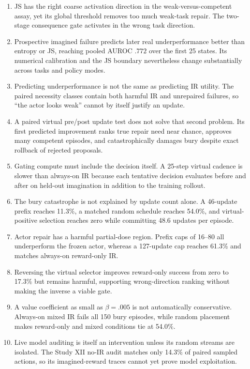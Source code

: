 \documentclass[10pt]{article}
\newcommand{\pct}[1]{#1\%}
\begin{document}
\begin{enumerate}
  \item JS has the right coarse activation direction in the weak-versus-competent assay, yet its global threshold removes too much weak-task repair. The two-stage consequence gate activates in the wrong task direction.
  \item Prospective imagined failure predicts later real underperformance better than entropy or JS, reaching pooled AUROC $.772$ over the first 25 states. Its numerical calibration and the JS boundary nevertheless change substantially across tasks and policy modes.
  \item Predicting underperformance is not the same as predicting IR utility. The paired necessity classes contain both harmful IR and unrepaired failures, so ``the actor looks weak'' cannot by itself justify an update.
  \item A paired virtual pre/post update test does not solve that second problem. Its first predicted improvement ranks true repair need near chance, approves many competent episodes, and catastrophically damages bury despite exact rollback of rejected proposals.
  \item Gating compute must include the decision itself. A 25-step virtual cadence is slower than always-on IR because each tentative decision evaluates before and after on held-out imagination in addition to the training rollout.
  \item The bury catastrophe is not explained by update count alone. A 46-update prefix reaches \pct{11.3}, a matched random schedule reaches \pct{54.0}, and virtual-positive selection reaches zero while committing 48.6 updates per episode.
  \item Actor repair has a harmful partial-dose region. Prefix caps of 16--80 all underperform the frozen actor, whereas a 127-update cap reaches \pct{61.3} and matches always-on reward-only IR.
  \item Reversing the virtual selector improves reward-only success from zero to \pct{17.3} but remains harmful, supporting wrong-direction ranking without making the inverse a viable gate.
  \item A value coefficient as small as $\beta=.005$ is not automatically conservative. Always-on mixed IR fails all 150 bury episodes, while random placement makes reward-only and mixed conditions tie at \pct{54.0}.
  \item Live model auditing is itself an intervention unless its random streams are isolated. The Study XII no-IR audit matches only \pct{14.3} of paired sampled actions, so its imagined-reward traces cannot yet prove model exploitation.
\end{enumerate}
\end{document}
